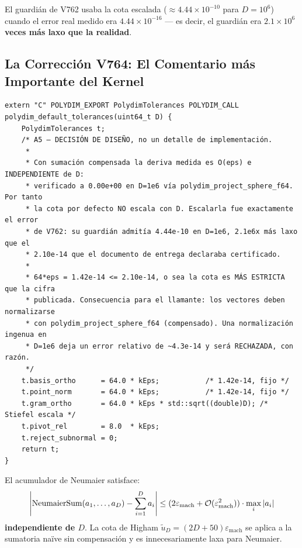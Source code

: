 El guardián de V762 usaba la cota escalada ($\approx 4.44 \times 10^{-10}$ para $D=10^6$)
cuando el error real medido era $4.44 \times 10^{-16}$ --- es decir, el guardián era
\textbf{$2.1 \times 10^{6}$ veces más laxo que la realidad}.

\subsection{La Corrección V764: El Comentario más Importante del Kernel}

\begin{lstlisting}[style=cppstyle, caption={Decisión de diseño de tolerancias --- A5 V764}, label=lst:tolerances_v764]
extern "C" POLYDIM_EXPORT PolydimTolerances POLYDIM_CALL
polydim_default_tolerances(uint64_t D) {
    PolydimTolerances t;
    /* A5 — DECISIÓN DE DISEÑO, no un detalle de implementación.
     *
     * Con sumación compensada la deriva medida es O(eps) e INDEPENDIENTE de D:
     * verificado a 0.00e+00 en D=1e6 vía polydim_project_sphere_f64. Por tanto
     * la cota por defecto NO escala con D. Escalarla fue exactamente el error
     * de V762: su guardián admitía 4.44e-10 en D=1e6, 2.1e6x más laxo que el
     * 2.10e-14 que el documento de entrega declaraba certificado.
     *
     * 64*eps = 1.42e-14 <= 2.10e-14, o sea la cota es MÁS ESTRICTA que la cifra
     * publicada. Consecuencia para el llamante: los vectores deben normalizarse
     * con polydim_project_sphere_f64 (compensado). Una normalización ingenua en
     * D=1e6 deja un error relativo de ~4.3e-14 y será RECHAZADA, con razón.
     */
    t.basis_ortho      = 64.0 * kEps;           /* 1.42e-14, fijo */
    t.point_norm       = 64.0 * kEps;           /* 1.42e-14, fijo */
    t.gram_ortho       = 64.0 * kEps * std::sqrt((double)D); /* Stiefel escala */
    t.pivot_rel        = 8.0  * kEps;
    t.reject_subnormal = 0;
    return t;
}
\end{lstlisting}

\begin{theorem}
\label{thm:neumaier_independence}
El acumulador de Neumaier satisface:
\begin{equation}
\abs{\text{NeumaierSum}(a_1, \ldots, a_D) - \sum_{i=1}^D a_i} \le (2\varepsilon_{\text{mach}} + \mathcal{O}(\varepsilon_{\text{mach}}^2)) \cdot \max_i |a_i|
\end{equation}
\textbf{independiente de $D$}. La cota de Higham $\tilde{u}_D = (2D + 50)\varepsilon_{\text{mach}}$
se aplica a la sumatoria naïve sin compensación y es innecesariamente laxa para Neumaier.
\end{theorem}

